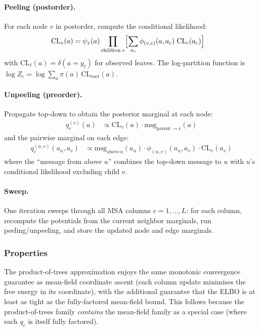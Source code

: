 \paragraph{Peeling (postorder).}
For each node $v$ in postorder, compute the conditional likelihood:
\begin{align}
\mathrm{CL}_v(a) &= \psi_v(a) \prod_{\mathrm{children}\; c}
  \Bigl[\sum_{a_c} \phi_{(v,c)}(a, a_c)\; \mathrm{CL}_c(a_c)\Bigr]
\label{eq:peel-tkf}
\end{align}
with $\mathrm{CL}_\ell(a) = \delta(a = y_\ell)$ for observed leaves.
The log-partition function is $\log Z_c = \log \sum_a \pi(a)\, \mathrm{CL}_{\mathrm{root}}(a)$.

\paragraph{Unpeeling (preorder).}
Propagate top-down to obtain the posterior marginal at each node:
\begin{align}
q_c^{(v)}(a) &\propto \mathrm{CL}_v(a) \cdot \mathrm{msg}_{\mathrm{parent} \to v}(a)
\label{eq:unpeel-marginal-tkf}
\end{align}
and the pairwise marginal on each edge:
\begin{align}
q_c^{(u,v)}(a_u, a_v)
 &\propto \mathrm{msg}_{\mathrm{above}\,u}(a_u) \cdot \phi_{(u,v)}(a_u, a_v) \cdot \mathrm{CL}_v(a_v)
\label{eq:unpeel-pair-tkf}
\end{align}
where the ``message from above $u$'' combines the top-down message to $u$
with $u$'s conditional likelihood excluding child $v$.

\paragraph{Sweep.}
One iteration sweeps through all MSA columns $c = 1, \ldots, L$:
for each column, recompute the potentials from the current neighbor marginals,
run peeling/unpeeling, and store the updated node and edge marginals.

\subsubsection{Properties}

The product-of-trees approximation enjoys the same monotonic convergence
guarantee as mean-field coordinate ascent (each column update minimises
the free energy in its coordinate), with the additional guarantee that
the ELBO is at least as tight as the fully-factored mean-field bound.
This follows because the product-of-trees family \emph{contains} the
mean-field family as a special case (where each $q_c$ is itself fully factored).

